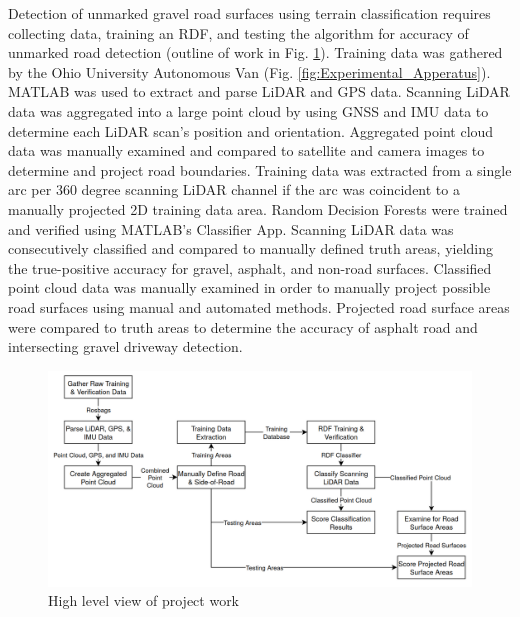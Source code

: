 \documentclass[journal,onecolumn]{IEEEtran}
\begin{document}
%		
	
		{Detection of unmarked gravel road surfaces using terrain classification requires collecting data, training an RDF, and testing the algorithm for accuracy of unmarked road detection (outline of work in Fig. \ref{fig:flowz_8}). Training data was gathered by the Ohio University Autonomous Van (Fig. \ref{fig:Experimental_Apperatus}). MATLAB was used to extract and parse LiDAR and GPS data. Scanning LiDAR data was aggregated into a large point cloud by using GNSS and IMU data to determine each LiDAR scan's position and orientation. Aggregated point cloud data was manually examined and compared to satellite and camera images to determine and project road boundaries. Training data was extracted from a single arc per 360 degree scanning LiDAR channel if the arc was coincident to a manually projected 2D training data area. Random Decision Forests were trained and verified using MATLAB's Classifier App. Scanning LiDAR data was consecutively classified and compared to manually defined truth areas, yielding the true-positive accuracy for gravel, asphalt, and non-road surfaces. Classified point cloud data was manually examined in order to manually project possible road surfaces using manual and automated methods. Projected road surface areas were compared to truth areas to determine the accuracy of asphalt road and intersecting gravel driveway detection.}
			
			\begin{figure}[H]
				\centering
				\includegraphics[width=0.9\linewidth]{figures/flowz_8}
				\caption[Project Flow]{High level view of project work}
				\label{fig:flowz_8}
			\end{figure}	
	
\end{document}
